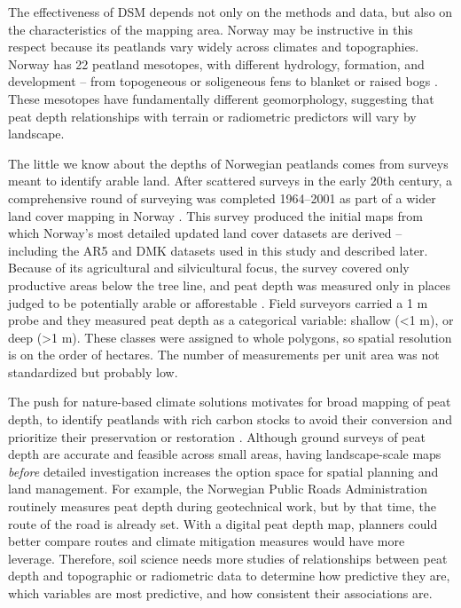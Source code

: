 \documentclass[soil, manuscript]{copernicus}
\begin{document}
The effectiveness of DSM depends not only on the methods and data, but also on the characteristics of the mapping area.
Norway may be instructive in this respect because its peatlands vary widely across climates and topographies.
Norway has 22 peatland mesotopes, with different hydrology, formation, and development -- from topogeneous or soligeneous fens to blanket or raised bogs \citep{joostenWiseUseMires2002, lyngstadBeskrivelserAvTorvmassivenheter2023}.
These mesotopes have fundamentally different geomorphology, suggesting that peat depth relationships with terrain or radiometric predictors will vary by landscape.

The little we know about the depths of Norwegian peatlands comes from surveys meant to identify arable land.
After scattered surveys in the early 20th century, a comprehensive round of surveying was completed 1964--2001 as part of a wider land cover mapping in Norway \citep{bjordalMarkslagsklassifikasjonOkonomiskKartverk2007}.
This survey produced the initial maps from which Norway's most detailed updated land cover datasets are derived -- including the AR5 and DMK datasets used in this study and described later.
Because of its agricultural and silvicultural focus, the survey covered only productive areas below the tree line, and peat depth was measured only in places judged to be potentially arable or afforestable \citep{ahlstromAR5Klassifikasjonssystem2019}.
Field surveyors carried a 1 m probe and they measured peat depth as a categorical variable: shallow (\textless1 m), or deep (\textgreater1 m).
These classes were assigned to whole polygons, so spatial resolution is on the order of hectares.
The number of measurements per unit area was not standardized but probably low.

The push for nature-based climate solutions motivates for broad mapping of peat depth, to identify peatlands with rich carbon stocks to avoid their conversion and prioritize their preservation or restoration \citep{strackPotentialPeatlandsNatureBased2022}.
Although ground surveys of peat depth are accurate and feasible across small areas, having landscape-scale maps \emph{before} detailed investigation increases the option space for spatial planning and land management.
For example, the Norwegian Public Roads Administration routinely measures peat depth during geotechnical work, but by that time, the route of the road is already set.
With a digital peat depth map, planners could better compare routes and climate mitigation measures would have more leverage.
Therefore, soil science needs more studies of relationships between peat depth and topographic or radiometric data to determine how predictive they are, which variables are most predictive, and how consistent their associations are.
\end{document}
